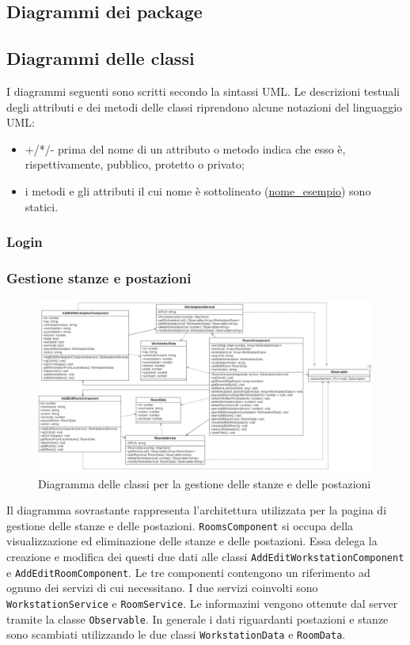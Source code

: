 \subsection{Diagrammi dei package}
\subsection{Diagrammi delle classi}
I diagrammi seguenti sono scritti secondo la sintassi UML. Le descrizioni testuali degli attributi e dei metodi delle classi riprendono alcune notazioni del linguaggio UML:
\begin{itemize}
	\item +/*/- prima del nome di un attributo o metodo indica che esso è, rispettivamente, pubblico, protetto o privato;
	\item i metodi e gli attributi il cui nome è sottolineato (\underline{nome\_esempio}) sono statici.
\end{itemize}
\subsubsection{Login}
\subsubsection{Gestione stanze e postazioni}
\begin{figure}[H]
	\centering
	\includegraphics[width=18cm]{res/images/webapp-visualAddEditStanzePostazioni-diagrammaClassi.png}
	\caption{Diagramma delle classi per la gestione delle stanze e delle postazioni}
	\label{fig:DiagrammaClassiStanzePostazioni}
\end{figure}
Il diagramma sovrastante rappresenta l'architettura utilizzata per la pagina di gestione delle stanze e delle postazioni. \newline
\texttt{RoomsComponent} si occupa della visualizzazione ed eliminazione delle stanze e delle postazioni. Essa delega la creazione e modifica dei questi due dati alle classi \texttt{AddEditWorkstationComponent} e \texttt{AddEditRoomComponent}. Le tre componenti contengono un riferimento ad ognuno dei servizi di cui necessitano. I due servizi coinvolti sono \texttt{WorkstationService} e \texttt{RoomService}. Le informazini vengono ottenute dal server tramite la classe \texttt{Observable}. In generale i dati riguardanti postazioni e stanze sono scambiati utilizzando le due classi \texttt{WorkstationData} e \texttt{RoomData}.


